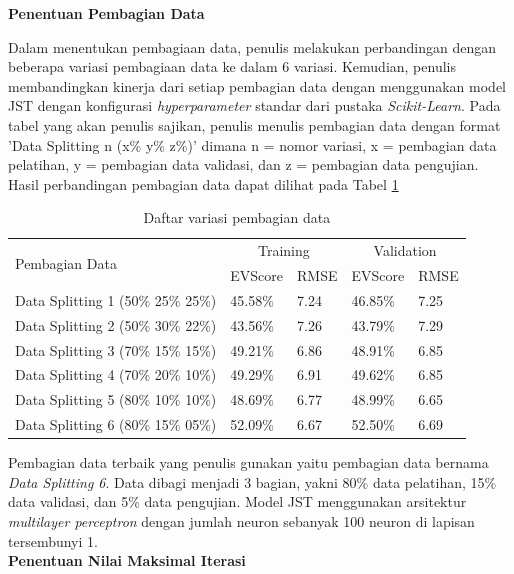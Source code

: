 \noindent \textbf{Penentuan Pembagian Data} 

Dalam menentukan pembagiaan data, penulis melakukan perbandingan dengan beberapa variasi pembagiaan data ke dalam 6 variasi. Kemudian, penulis membandingkan kinerja dari setiap pembagian data dengan menggunakan model JST dengan konfigurasi \textit{hyperparameter} standar dari pustaka \textit{Scikit-Learn}. Pada tabel yang akan penulis sajikan, penulis menulis pembagian data dengan format 'Data Splitting n (x\% y\% z\%)' dimana n = nomor variasi, x = pembagian data pelatihan, y = pembagian data validasi, dan z = pembagian data pengujian. Hasil perbandingan pembagian data dapat dilihat pada Tabel \ref{tbl:5:DataSplitting}
\begin{table}[!h]
	\caption{Daftar variasi pembagian data}
	\label{tbl:5:DataSplitting}
	\centering
	\begin{tabular}{|p{6cm}|p{1.5cm}|p{1cm}|p{1.5cm}|p{1cm}|}
		\hline
		\multirow{2}{*}{Pembagian Data } & \multicolumn{2}{|c|}{Training} & \multicolumn{2}{|c|}{Validation} \\
		\cline{2-5}	
		         & EVScore & RMSE & EVScore & RMSE \\
		\hline
		Data Splitting 1 (50\% 25\% 25\%) & 45.58\% & 7.24 & 46.85\% & 7.25 \\
		\hline
		Data Splitting 2 (50\% 30\% 22\%) & 43.56\% & 7.26 & 43.79\% & 7.29 \\
		\hline
		Data Splitting 3 (70\% 15\% 15\%) & 49.21\% & 6.86 & 48.91\% & 6.85 \\
		\hline
		Data Splitting 4 (70\% 20\% 10\%) & 49.29\% & 6.91 & 49.62\% & 6.85 \\
		\hline
		Data Splitting 5 (80\% 10\% 10\%) & 48.69\% & 6.77 & 48.99\% & 6.65 \\
		\hline
		Data Splitting 6 (80\% 15\% 05\%) & 52.09\% & 6.67 & 52.50\% & 6.69 \\
		\hline
	\end{tabular}
\end{table}

Pembagian data terbaik yang penulis gunakan yaitu pembagian data bernama \textit{Data Splitting 6}. Data dibagi menjadi 3 bagian, yakni 80\% data pelatihan, 15\% data validasi, dan 5\% data pengujian. Model JST menggunakan arsitektur \textit{multilayer perceptron} dengan jumlah neuron sebanyak 100 neuron di lapisan tersembunyi 1. \\

\noindent \textbf{Penentuan Nilai Maksimal Iterasi}

